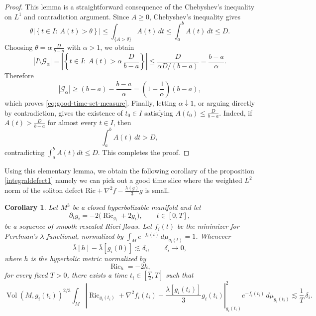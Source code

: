\documentclass{amsart}
\newtheorem{corollary}{Corollary}[section]
\begin{document}
\begin{proof} This lemma is a straightforward consequence of the Chebyshev's inequality on $L^{1}$ and contradiction argument.
Since \(A\geq 0\), Chebyshev's inequality gives
\[
        \theta
        \left|
        \left\{
        t\in I:\ A(t)>\theta
        \right\}
        \right|
        \leq
        \int_{\{A>\theta\}}A(t)\,dt
        \leq
        \int_a^b A(t)\,dt
        \leq D.
\]
Choosing
$\theta=\alpha\,\frac{D}{b-a}$
with \(\alpha>1\), we obtain
\[
        |I\setminus \mathcal G_{\alpha}|
        =
        \left|
        \left\{
        t\in I:\ 
        A(t)>
        \alpha\,\frac{D}{b-a}
        \right\}
        \right|
        \leq
        \frac{D}{\alpha D/(b-a)}
        =
        \frac{b-a}{\alpha}.
\]
Therefore
\[
        |\mathcal G_{\alpha}|
        \geq
        (b-a)-\frac{b-a}{\alpha}
        =
        \left(1-\frac{1}{\alpha}\right)(b-a),
\]
which proves \eqref{eq:good-time-set-measure}. Finally, letting \(\alpha\downarrow 1\), or arguing directly by contradiction, gives the existence of \(t_0\in I\) satisfying $A(t_0)
        \leq
        \frac{D}{b-a}$. Indeed, if
$ A(t)>\frac{D}{b-a}$
for almost every \(t\in I\), then
\[
        \int_a^b A(t)\,dt>D,
\]
contradicting $\int_{a}^{b}A(t)dt\leq D$. This completes the proof.
\end{proof}
\noindent Using this elementary lemma, we obtain the following corollary of the proposition \ref{integraldefect1} namely we can pick out a good time slice where the weighted $L^{2}$ norm of the soliton defect $\text{Ric}+\nabla^{2}f-\frac{\lambda(g)}{3}g$ is small. 
\begin{corollary}
\label{cor:perelman-good-time}
Let \(M^{3}\) be a closed hyperbolizable manifold and let
\[
        \partial_t g_i=-2\bigl(\operatorname{Ric}_{g_i}+2g_i\bigr),
        \qquad t\in[0,T],
\]
be a sequence of smooth rescaled Ricci flows. Let \(f_i(t)\) be the minimizer
for Perelman's \(\lambda\)-functional, normalized by $\int_M e^{-f_i(t)}\,d\mu_{g_i(t)}=1$. 
Whenever
\begin{equation}
\label{eq:entropy-deficit-bound}
        \overline{\lambda}[h]-\overline{\lambda}[g_i(0)]
        \lesssim
        \delta_i,
        \qquad
        \delta_i\to 0,
\end{equation}
where \(h\) is the hyperbolic metric normalized by
\[
        \operatorname{Ric}_h=-2h,
\]
for every fixed \(T>0\), there exists a time $t_i\in \left[\frac{T}{2},T\right]$
such that
\begin{equation}
\label{eq:perelman-good-time-estimate}
 \operatorname{Vol}(M,g_i(t_i))^{2/3}
        \int_M
        \left|
        \operatorname{Ric}_{g_i(t_i)}
        +
        \nabla^2 f_i(t_i)
        -
        \frac{\lambda[g_i(t_i)]}{3}g_i(t_i)
        \right|_{g_i(t_i)}^2
        e^{-f_i(t_i)}\,d\mu_{g_i(t_i)}
        \lesssim
        \frac{1}{T}\,\delta_i.
\end{equation}
\end{corollary}
\end{document}
